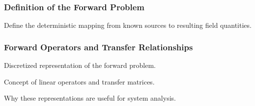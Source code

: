\subsubsection{Definition of the Forward Problem}
Define the deterministic mapping from known sources to resulting field quantities.


\subsubsection{Forward Operators and Transfer Relationships}
Discretized representation of the forward problem.

Concept of linear operators and transfer matrices.

Why these representations are useful for system analysis.

